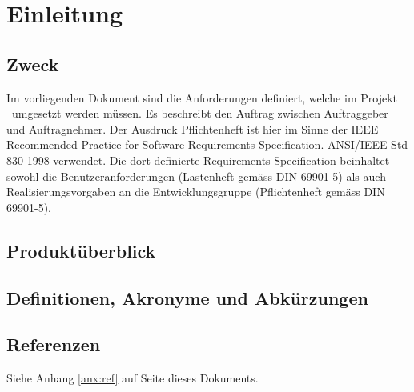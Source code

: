 \section{Einleitung}
\label{sec:intro}

\subsection{Zweck}
Im vorliegenden Dokument sind die Anforderungen definiert, welche im Projekt \subjectinfo\ umgesetzt werden müssen. 
Es beschreibt den Auftrag zwischen Auftraggeber und Auftragnehmer. 
Der Ausdruck Pflichtenheft ist hier im Sinne der IEEE Recommended Practice for Software Requirements Specification. ANSI/IEEE Std 830-1998 verwendet.
Die dort definierte Requirements Specification beinhaltet sowohl die Benutzeranforderungen (Lastenheft gemäss DIN 69901-5) als auch Realisierungsvorgaben an die Entwicklungsgruppe (Pflichtenheft gemäss DIN 69901-5).

\subsection{Produktüberblick}

\subsection{Definitionen, Akronyme und Abkürzungen}

\subsection{Referenzen}
Siehe Anhang \ref{anx:ref} auf Seite \pageref{anx:ref} dieses Dokuments.